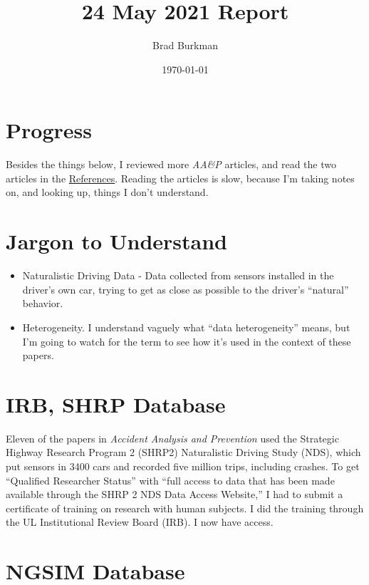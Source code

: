 \documentclass[11pt]{article}
\title{24 May 2021 Report}
\author{Brad Burkman}
\date{\today}
\begin{document}
\setlength{\parindent}{20pt}
\begin{spacing}{1.2}


\maketitle
\tableofcontents

\section{Progress}

Besides the things below, I reviewed more {\it AA\&P} articles, and read the two articles in the \hyperref[sec:references]{References}.  Reading the articles is slow, because I'm taking notes on, and looking up, things I don't understand.  

\section{Jargon to Understand}

\begin{itemize}
	\item Naturalistic Driving Data - Data collected from sensors installed in the driver's own car, trying to get as close as possible to the driver's ``natural'' behavior.
	\item Heterogeneity.  I understand vaguely what ``data heterogeneity'' means, but I'm going to watch for the term to see how it's used in the context of these papers.  
\end{itemize}

\section{IRB, SHRP Database}

Eleven of the papers in {\it Accident Analysis and Prevention} used the Strategic Highway Research Program 2 (SHRP2) Naturalistic Driving Study (NDS), which put sensors in 3400 cars and recorded five million trips, including crashes.  To get ``Qualified Researcher Status'' with ``full access to data that has been made available through the SHRP 2 NDS Data Access Website,'' I had to submit a certificate of training on research with human subjects.  I did the training through the UL Institutional Review Board (IRB). I now have access.  

\section{NGSIM Database}


\end{spacing}
\end{document}
